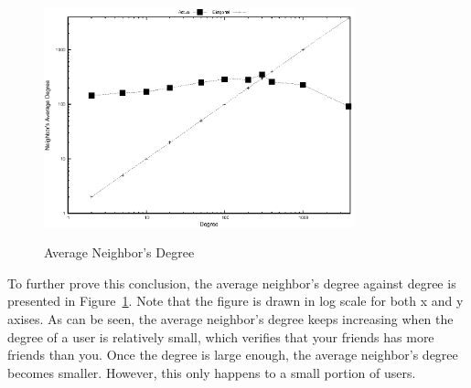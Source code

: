 \documentclass[11pt, oneside]{article}   	%
\begin{document}
\begin{figure}[t]
  \centering
  \caption{Average Neighbor's Degree} 
       \includegraphics[width=0.8\textwidth]{figures/avg.eps}
  \label{fig:avg}
\end{figure} 

To further prove this conclusion, the average neighbor's degree against degree is presented in Figure~\ref{fig:avg}.
Note that the figure is drawn in log scale for both x and y axises. As can be seen, the average neighbor's degree 
keeps increasing when the degree of a user is relatively small, which verifies that your friends has more friends than
you. Once the degree is large enough, the average neighbor's degree becomes smaller. However, this only 
happens to a small portion of users. 
\end{document}
